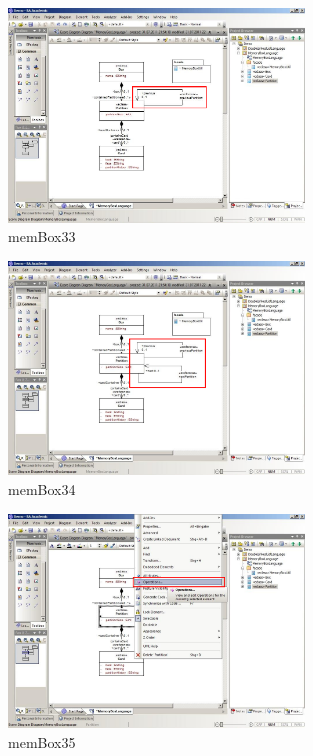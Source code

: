 \begin{figure}[!h]
	\centering
  \includegraphics[width=0.7\textwidth]{pics/memBox33.png}
	\caption{memBox33}
	\label{memBox33}
\end{figure}

\begin{figure}[!h]
	\centering
  \includegraphics[width=0.7\textwidth]{pics/memBox34.png}
	\caption{memBox34}
	\label{memBox34}
\end{figure}

\begin{figure}[!h]
	\centering
  \includegraphics[width=0.7\textwidth]{pics/memBox35.png}
	\caption{memBox35}
	\label{memBox35}
\end{figure}

